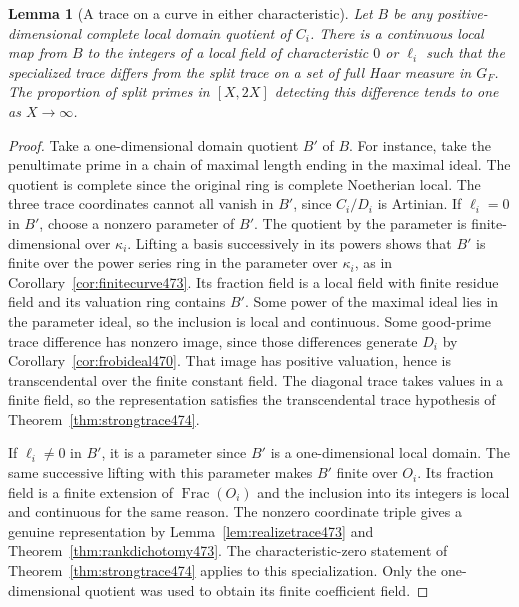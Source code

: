\documentclass[a4paper,11pt]{article}
\newtheorem{lemma}[proposition]{Lemma}
\theoremstyle{definition}
\theoremstyle{remark}
\numberwithin{equation}{section}
\begin{document}
\begin{lemma}[A trace on a curve in either characteristic]\leavevmode
\label{lem:mixedtrace490}
Let \(B\) be any positive-dimensional complete local domain
quotient of \(C_i\). There is a continuous local map from \(B\)
to the integers of a local field of characteristic \(0\) or
\(\ell_i\) such that the specialized trace differs from the
split trace on a set of full Haar measure in \(G_F\).
The proportion of split primes in \([X,2X]\) detecting this
difference tends to one as \(X\to\infty\).
\end{lemma}
\begin{proof}
Take a one-dimensional domain quotient \(B'\) of \(B\). For
instance, take the penultimate prime in a chain of maximal length
ending in the maximal ideal. The quotient is complete since
the original ring is complete Noetherian local. The three trace
coordinates cannot all vanish in \(B'\), since \(C_i/D_i\) is
Artinian. If \(\ell_i=0\) in \(B'\), choose a nonzero parameter
of \(B'\). The quotient by the parameter is finite-dimensional
over \(\kappa_i\). Lifting a basis successively in its powers
shows that \(B'\) is finite over the power series ring in the
parameter over \(\kappa_i\), as in
Corollary~\ref{cor:finitecurve473}. Its fraction field is a
local field with finite residue field and its valuation ring
contains \(B'\). Some power of the maximal ideal lies in the
parameter ideal, so the inclusion is local and continuous.
Some good-prime trace difference has nonzero image, since those
differences generate \(D_i\) by Corollary~\ref{cor:frobideal470}.
That image has positive valuation, hence is transcendental over
the finite constant field. The diagonal trace takes values in a
finite field, so the representation satisfies the transcendental
trace hypothesis of Theorem~\ref{thm:strongtrace474}.

If \(\ell_i\ne0\) in \(B'\), it is a parameter since \(B'\) is a
one-dimensional local domain. The same successive lifting with
this parameter makes \(B'\) finite over \(O_i\). Its fraction
field is a finite extension of \(\operatorname{Frac}(O_i)\) and
the inclusion into its integers is local and continuous for the
same reason. The nonzero coordinate triple gives a genuine
representation by Lemma~\ref{lem:realizetrace473} and
Theorem~\ref{thm:rankdichotomy473}. The characteristic-zero
statement of Theorem~\ref{thm:strongtrace474} applies to this
specialization. Only the one-dimensional quotient was used to
obtain its finite coefficient field.


\end{proof}
\end{document}
